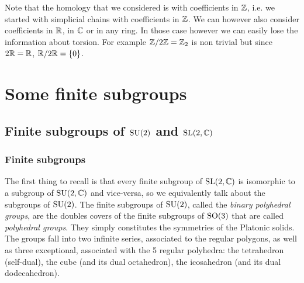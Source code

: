     Note that the homology that we considered is with coefficients in $\mathbb{Z}$, i.e. we started with simplicial chains with coefficients in $\mathbb{Z}$. We can however also consider coefficients in $\mathbb{R}$, in $\mathbb{C}$ or in any ring. In those case however we can easily lose the information about torsion. For example $\mathbb{Z}/2\mathbb{Z}=\mathbb{Z}_2$ is non trivial but since $2\mathbb{R}=\mathbb{R}$, $\mathbb{R}/2\mathbb{R}=\{0\}$.

\section{Some finite subgroups}

    \subsection{Finite subgroups of $\text{SU}(2)$ and $\text{SL}(2,\mathbb{C})$}\label{app:su2subgroups}

        \subsubsection{Finite subgroups}

            The first thing to recall is that every finite subgroup of $\text{SL}(2,\mathbb{C})$ is isomorphic to a subgroup of $\text{SU}(2,\mathbb{C})$ and vice-versa, so we equivalently talk about the subgroups of $\text{SU}(2)$. The finite subgroups of $\text{SU}(2)$, called the \emph{binary polyhedral groups}, are the doubles covers of the finite subgroups of $\text{SO}(3)$ that are called \emph{polyhedral groups}. They simply constitutes the symmetries of the Platonic solids. The groups fall into two infinite series, associated to the regular polygons, as well as three exceptional, associated with the 5 regular polyhedra: the tetrahedron (self-dual), the cube (and its dual octahedron), the icosahedron (and its dual dodecahedron).

